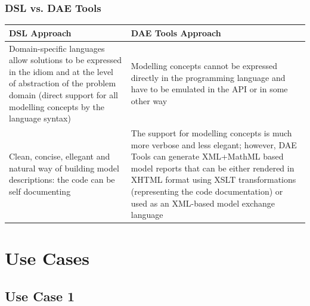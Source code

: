 \documentclass{beamer}
\begin{document}
\begin{frame}
\frametitle{DSL vs. DAE Tools}
\begin{center}
    \begin{tabular}{ p{0.4\paperwidth} | p{0.4\paperwidth} }
    \hline
    \footnotesize{DSL Approach} & \footnotesize{DAE Tools Approach} \\ \hline
    \footnotesize{Domain-specific languages allow solutions to be expressed in the idiom and at the level of abstraction of the problem domain 
    (direct support for all modelling concepts by the language syntax)}
    &
    \footnotesize{Modelling concepts cannot be expressed directly in the programming language and have to be emulated in the API or in 
    some other way}
    \\ \hline
    
    \footnotesize{Clean, concise, ellegant and natural way of building model descriptions: the code can be self documenting}
    &
    \footnotesize{The support for modelling concepts is much more verbose and less elegant; however, DAE Tools can generate XML+MathML 
    based model reports that can be either rendered in XHTML format using XSLT transformations (representing the code documentation) 
    or used as an XML-based model exchange language}
    \\ \hline
    
    
    \end{tabular}
\end{center}
\end{frame}

\section{Use Cases} 
\subsection{Use Case 1}
\begin{frame}
\frametitle{}
\end{frame}
\end{document}
